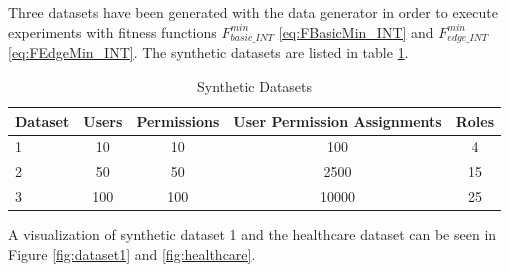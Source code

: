 Three datasets have been generated with the data generator in order to execute experiments with fitness functions $F_{basic\_INT}^{min}$ \eqref{eq:FBasicMin_INT} and $F_{edge\_INT}^{min}$ \eqref{eq:FEdgeMin_INT}. The synthetic datasets are listed in table \ref{tab:syntheticDatasets}.
\begin{table}
    \centering
    \begin{tabular}{|l|c|c|c|c|}
        \hline
        \rowcolor{myGray} 
        \textbf{Dataset} & \textbf{Users} & \textbf{Permissions} & \textbf{User Permission Assignments} & \textbf{Roles}\\ \hline
        1       & 10    & 10   & 100    & 4\\ \hline
        2       & 50    & 50   & 2500   & 15\\ \hline
        3       & 100   & 100  & 10000  & 25\\ \hline
    \end{tabular}
    \caption{Synthetic Datasets}
    \label{tab:syntheticDatasets}
\end{table}
A visualization of synthetic dataset 1 and the healthcare dataset can be seen in Figure \ref{fig:dataset1} and \ref{fig:healthcare}.


